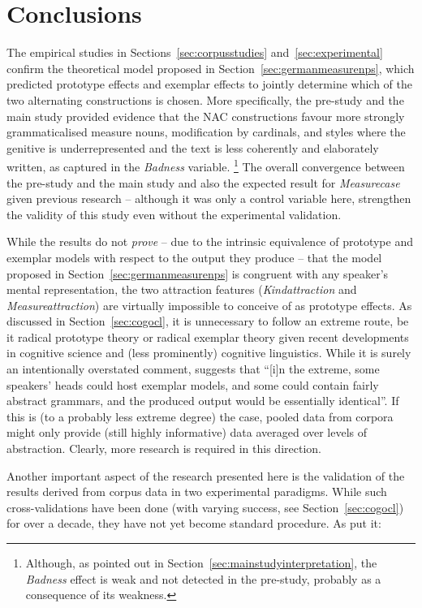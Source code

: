 \section{Conclusions}
\label{sec:conclusion}

The empirical studies in Sections~\ref{sec:corpusstudies} and~\ref{sec:experimental} confirm the theoretical model proposed in Section~\ref{sec:germanmeasurenps}, which predicted prototype effects and exemplar effects to jointly determine which of the two alternating constructions is chosen.
More specifically, the pre-study and the main study provided evidence that the NAC constructions favour more strongly grammaticalised measure nouns, modification by cardinals, and styles where the genitive is underrepresented and the text is less coherently and elaborately written, as captured in the \textit{Badness} variable.%
\footnote{Although, as pointed out in Section~\ref{sec:mainstudyinterpretation}, the \textit{Badness} effect is weak and not detected in the pre-study, probably as a consequence of its weakness.}
The overall convergence between the pre-study and the main study and also the expected result for \textit{Measurecase} given previous research \citep{Zimmer2015} -- although it was only a control variable here, strengthen the validity of this study even without the experimental validation.

While the results do not \textit{prove} -- due to the intrinsic equivalence of prototype and exemplar models with respect to the output they produce -- that the model proposed in Section~\ref{sec:germanmeasurenps} is congruent with any speaker's mental representation, the two attraction features (\textit{Kindattraction} and \textit{Measureattraction}) are virtually impossible to conceive of as prototype effects.
As discussed in Section~\ref{sec:cogocl}, it is unnecessary to follow an extreme route, be it radical prototype theory or radical exemplar theory given recent developments in cognitive science and (less prominently) cognitive linguistics.
While it is surely an intentionally overstated comment, \citet[15]{Kapatsinski2014} suggests that ``[i]n the extreme, some speakers’ heads could host exemplar models, and some could contain fairly abstract grammars, and the produced output would be essentially identical''.
If this is (to a probably less extreme degree) the case, pooled data from corpora might only provide (still highly informative) data averaged over levels of abstraction.
Clearly, more research is required in this direction.

Another important aspect of the research presented here is the validation of the results derived from corpus data in two experimental paradigms.
While such cross-validations have been done (with varying success, see Section~\ref{sec:cogocl}) for over a decade, they have not yet become standard procedure.
As \citet[3--4]{DivjakEa2016a} put it:


